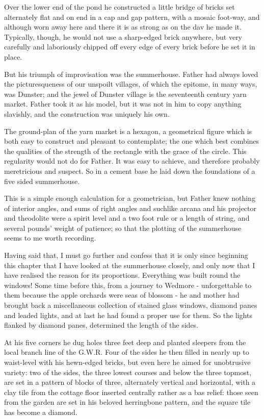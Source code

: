 Over the lower end of the pond he constructed a little bridge of bricks set alternately flat and on end in a cap and gap pattern, with a mosaic foot-way, and although worn away here and there it is as strong as on the dav he made it. Typically, though, he would not use a sharp-edged brick anywhere, but very carefully and laboriously chipped off every edge of every brick before he set it in place.

But his triumph of improvisation was the summerhouse. Father had always loved the picturesqueness of our unspoilt villages, of which the epitome, in many ways, was Dunster; and the jewel of Dunster village is the seventeenth century yarn market. Father took it as his model, but it was not in him to copy anything slavishly, and the construction was uniquely his own.

The ground-plan of the yarn market is a hexagon, a geometrical figure which is both easy to construct and pleasant to contemplate; the one which best combines the qualities of the strength of the rectangle with the grace of the circle. This regularity would not do for Father. It was easy to achieve, and therefore probably meretricious and suspect. So in a cement base he laid down the foundations of a five sided summerhouse.

This is a simple enough calculation for a geometrician, but Father knew nothing of interior angles, and sums of right angles and suchlike arcana and his projector and theodolite were a spirit level and a two foot rule or a length of string, and several pounds' weight of patience; so that the plotting of the summerhouse seems to me worth recording.

Having said that, I must go further and confess that it is only since beginning this chapter that I have looked at the summerhouse closely, and only now that I have realised the reason for its proportions. Everything was built round the windows! Some time before this, from a journey to Wedmore - unforgettable to them because the apple orchards were seas of blossom - he and mother had brought back a miscellaneous collection of stained glass windows, diamond panes and leaded lights, and at last he had found a proper use for them. So the lights flanked by diamond panes, determined the length of the sides.

At his five corners he dug holes three feet deep and planted sleepers from the local branch line of the G.W.R. Four of the sides he then filled in nearly up to waist-level with his hewn-edged bricks, but even here he aimed for unobtrusive variety: two of the sides, the three lowest courses and below the three topmost, are set in a pattern of blocks of three, alternately vertical and horizontal, with a clay tile from the cottage floor inserted centrally rather as a bas relief: those seen from the garden are set in his beloved herringbone pattern, and the square tile has become a diamond.

